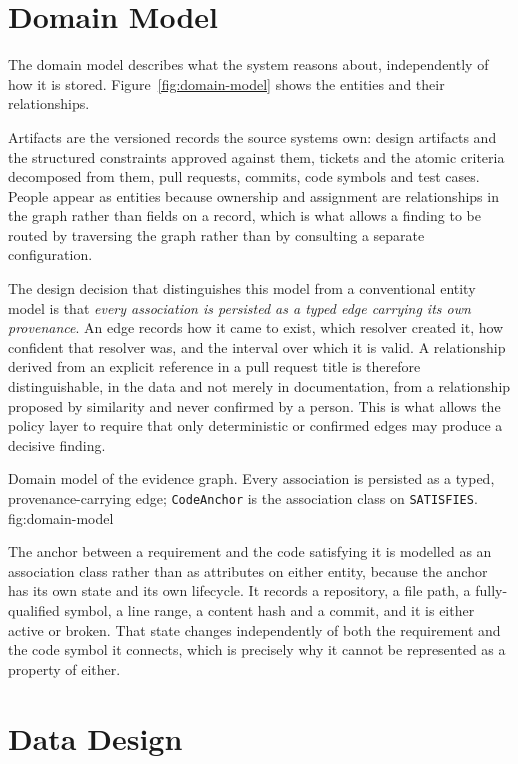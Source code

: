 \section{Domain Model}

The domain model describes what the system reasons about, independently of how
it is stored. Figure~\ref{fig:domain-model} shows the entities and their
relationships.

Artifacts are the versioned records the source systems own: design artifacts and
the structured constraints approved against them, tickets and the atomic
criteria decomposed from them, pull requests, commits, code symbols and test
cases. People appear as entities because ownership and assignment are
relationships in the graph rather than fields on a record, which is what allows
a finding to be routed by traversing the graph rather than by consulting a
separate configuration.

The design decision that distinguishes this model from a conventional entity
model is that \emph{every association is persisted as a typed edge carrying its
own provenance}. An edge records how it came to exist, which resolver created
it, how confident that resolver was, and the interval over which it is valid. A
relationship derived from an explicit reference in a pull request title is
therefore distinguishable, in the data and not merely in documentation, from a
relationship proposed by similarity and never confirmed by a person. This is
what allows the policy layer to require that only deterministic or confirmed
edges may produce a decisive finding.

\lsfigure{}
  {Domain model of the evidence graph. Every association is persisted
           as a typed, provenance-carrying edge; \texttt{CodeAnchor} is the
           association class on \texttt{SATISFIES}.}
  {fig:domain-model}

The anchor between a requirement and the code satisfying it is modelled as an
association class rather than as attributes on either entity, because the anchor
has its own state and its own lifecycle. It records a repository, a file path, a
fully-qualified symbol, a line range, a content hash and a commit, and it is
either active or broken. That state changes independently of both the
requirement and the code symbol it connects, which is precisely why it cannot be
represented as a property of either.

\section{Data Design}

